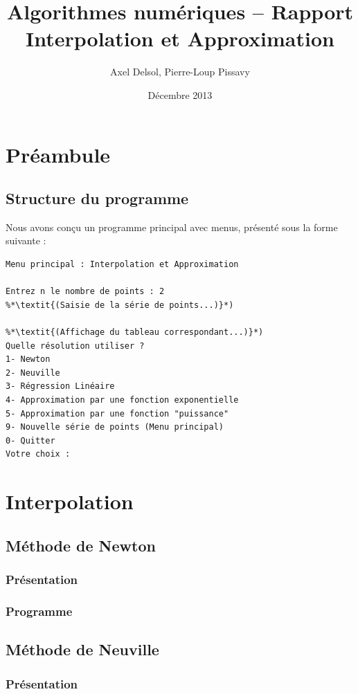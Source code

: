 \documentclass{report}
\title{Algorithmes numériques -- Rapport \\ \vspace{0.5cm}Interpolation et Approximation}
\author{Axel Delsol, Pierre-Loup Pissavy}
\date{Décembre 2013}
\begin{document}
  \maketitle
  \tableofcontents

  \chapter{Préambule}
    \section{Structure du programme}
    Nous avons conçu un programme principal avec menus, présenté sous la forme suivante :
    \begin{lstlisting}[style=apercu, name=Menu Principal]
Menu principal : Interpolation et Approximation

Entrez n le nombre de points : 2
%*\textit{(Saisie de la série de points...)}*)

%*\textit{(Affichage du tableau correspondant...)}*)
Quelle résolution utiliser ?
1- Newton
2- Neuville
3- Régression Linéaire
4- Approximation par une fonction exponentielle
5- Approximation par une fonction "puissance"
9- Nouvelle série de points (Menu principal)
0- Quitter
Votre choix :
    \end{lstlisting}
  \chapter{Interpolation}
    \section{Méthode de Newton}
      \subsection{Présentation}
	
      \subsection{Programme}
	
    \newpage
    \section{Méthode de Neuville}
      \subsection{Présentation}
	
\end{document}
